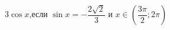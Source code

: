 \begin{ex}[type=calculate_expression]
	\begin{condition}
		\( 3\cos x \),\quad если \( \sin x=-\dfrac{2\sqrt{2}}{3} \) и \( x\in\left( \dfrac{3\pi}{2};2\pi \right) \)
	\end{condition}
\end{ex}